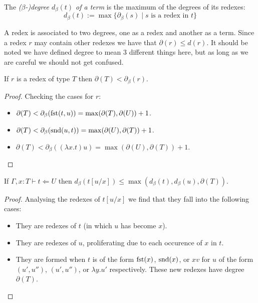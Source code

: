 \begin{defin}
    The \emph{($\beta$-)degree $d_{\beta}(t)$ of a term} is the maximum of the degrees of its redexes:
    $$
        d_{\beta}(t) := \max \{\partial_{\beta} (s) \mid s \text{ is a redex in } t\}
    $$
\end{defin}

\begin{remark}
    A redex is associated to two degrees, one as a redex and another as a term. Since a redex $r$ may contain other redexes we have that $\partial (r) \le d(r)$. It should be noted we have defined degree to mean 3 different things here, but as long as we are careful we should not get confused.
\end{remark}

\begin{lemma}\label{beta_redex_ineq}
    If $r$ is a redex of type $T$ then $\partial(T) < \partial_{\beta}(r)$. 
\end{lemma}

\begin{proof}
    Checking the cases for $r$:
    \begin{itemize}
        \item $\partial (T) < \partial_{\beta}(\mathrm{fst}(t, u)) = \max(\partial(T), \partial(U)) + 1$.
        \item $\partial (T) < \partial_{\beta}(\mathrm{snd}(u, t)) = \max(\partial(U), \partial(T)) + 1$.
        \item $\partial (T) < \partial_{\beta}((\lambda x . t)u) = \max(\partial(U), \partial(T)) + 1$.
    \end{itemize}
\end{proof}

\begin{lemma}\label{beta_sub_ineq}
    If $\Gamma , x : T \vdash t \Leftarrow U$ then $d_{\beta}(t[u/x]) \leq \max(d_{\beta}(t), d_{\beta}(u), \partial(T))$.
\end{lemma}

\begin{proof}
    Analysing the redexes of $t[u/x]$ we find that they fall into the following cases:
    \begin{itemize}
        \item They are redexes of $t$ (in which $u$ has become $x$).
        \item They are redexes of $u$, proliferating due to each occurence of $x$ in $t$.
        \item They are formed when $t$ is of the form $\mathrm{fst}(x)$, $\mathrm{snd}(x)$, or $x v$ for $u$ of the form $(u', u'')$, $(u', u'')$, or $\lambda y . u'$ respectively. These new redexes have degree $\partial(T)$.
    \end{itemize}
\end{proof}

